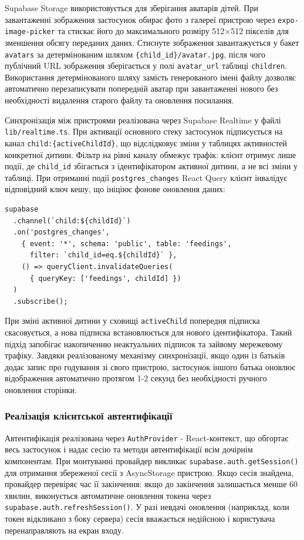 Supabase Storage використовується для зберігання аватарів дітей. При завантаженні зображення застосунок обирає фото з галереї пристрою через \texttt{expo-image-picker} та стискає його до максимального розміру 512×512 пікселів для зменшення обсягу переданих даних. Стиснуте зображення завантажується у бакет \texttt{avatars} за детермінованим шляхом \texttt{\{child\_id\}/avatar.jpg}, після чого публічний \gls{URL} зображення зберігається у полі \texttt{avatar\_url} таблиці \texttt{children}. Використання детермінованого шляху замість генерованого імені файлу дозволяє автоматично перезаписувати попередній аватар при завантаженні нового без необхідності видалення старого файлу та оновлення посилання.

Синхронізація між пристроями реалізована через Supabase Realtime у файлі \texttt{lib/realtime.ts}. При активації основного стеку застосунок підписується на канал \texttt{child:\{activeChildId\}}, що відслідковує зміни у таблицях активностей конкретної дитини. Фільтр на рівні каналу обмежує трафік: клієнт отримує лише події, де \texttt{child\_id} збігається з ідентифікатором активної дитини, а не всі зміни у таблиці. При отриманні події \texttt{postgres\_changes} React Query клієнт інвалідує відповідний ключ кешу, що ініціює фонове оновлення даних:

\begin{verbatim}
supabase
  .channel(`child:${childId}`)
  .on('postgres_changes',
    { event: '*', schema: 'public', table: 'feedings',
      filter: `child_id=eq.${childId}` },
    () => queryClient.invalidateQueries(
      { queryKey: ['feedings', childId] })
  )
  .subscribe();
\end{verbatim}

При зміні активної дитини у сховищі \texttt{activeChild} попередня підписка скасовується, а нова підписка встановлюється для нового ідентифікатора. Такий підхід запобігає накопиченню неактуальних підписок та зайвому мережевому трафіку. Завдяки реалізованому механізму синхронізації, якщо один із батьків додає запис про годування зі свого пристрою, застосунок іншого батька оновлює відображення автоматично протягом 1-2 секунд без необхідності ручного оновлення сторінки.

\subsubsection{Реалізація клієнтської автентифікації}

Автентифікація реалізована через \texttt{AuthProvider} - React-контекст, що обгортає весь застосунок і надає сесію та методи автентифікації всім дочірнім компонентам. При монтуванні провайдер викликає \texttt{supabase.auth.getSession()} для отримання збереженої сесії з AsyncStorage пристрою. Якщо сесія знайдена, провайдер перевіряє час її закінчення: якщо до закінчення залишається менше 60 хвилин, виконується автоматичне оновлення токена через \texttt{supabase.auth.refreshSession()}. У разі невдачі оновлення (наприклад, коли токен відкликано з боку сервера) сесія вважається недійсною і користувача перенаправляють на екран входу.

